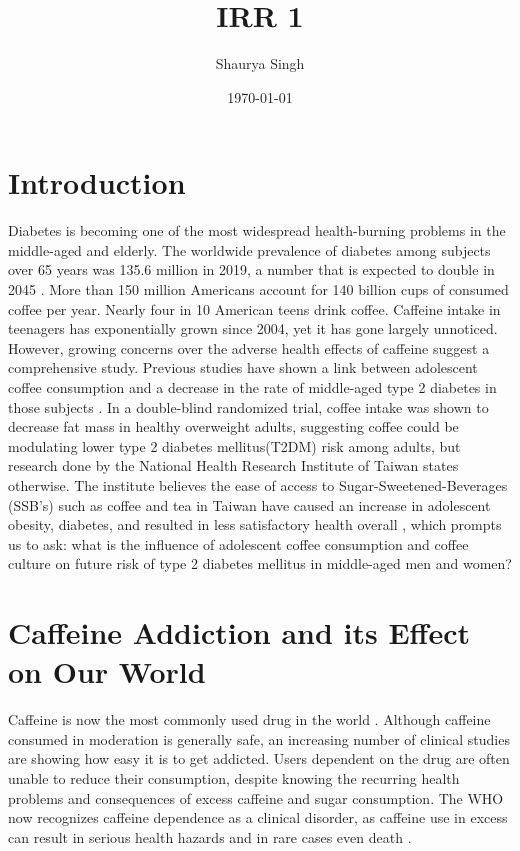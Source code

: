 \documentclass{scrartcl}
\author{Shaurya Singh}
\date{\today}
\title{IRR 1}
\begin{document}
\maketitle

\section*{Introduction}
\label{sec:orgcb881f2}
Diabetes is becoming one of the most widespread health-burning problems in the middle-aged and elderly. The worldwide prevalence of diabetes among subjects over 65 years was 135.6 million in 2019, a number that is expected to double in 2045 \autocite{2020}. More than 150 million Americans account for 140 billion cups of consumed coffee per year. Nearly four in 10 American teens drink coffee. Caffeine intake in teenagers has exponentially grown since 2004, yet it has gone largely unnoticed. However, growing concerns over the adverse health effects of caffeine suggest a comprehensive study. Previous studies have shown a link between adolescent coffee consumption and a decrease in the rate of middle-aged type 2 diabetes in those subjects \autocite{2019}. In a double-blind randomized trial, coffee intake was shown to decrease fat mass in healthy overweight adults, suggesting coffee could be modulating lower type 2 diabetes mellitus(T2DM) risk among adults, but research done by the National Health Research Institute of Taiwan states otherwise. The institute believes the ease of access to Sugar-Sweetened-Beverages (SSB’s) such as coffee and tea in Taiwan have caused an increase in adolescent obesity, diabetes, and resulted in less satisfactory health overall \autocite{2011}, which prompts us to ask: what is the influence of adolescent coffee consumption and coffee culture on future risk of type 2 diabetes mellitus in middle-aged men and women?

\section*{Caffeine Addiction and its Effect on Our World}
\label{sec:org0c0c9b8}
Caffeine is now the most commonly used drug in the world \autocite{gilbert1984caffeine}. Although caffeine consumed in moderation is generally safe, an increasing number of clinical studies are showing how easy it is to get addicted. Users dependent on the drug are often unable to reduce their consumption, despite knowing the recurring health problems and consequences of excess caffeine and sugar consumption. The WHO now recognizes caffeine dependence as a clinical disorder, as caffeine use in excess can result in serious health hazards and in rare cases even death \autocite{brockwell1991caffeine}.
\end{document}
